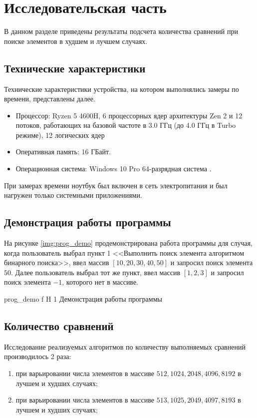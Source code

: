 \chapter{Исследовательская часть}

В данном разделе приведены результаты подсчета количества сравнений при поиске элементов в худшем и лучшем случаях.

\section{Технические характеристики}

Технические характеристики устройства, на котором выполнялись замеры по времени, представлены далее.

\begin{itemize}
	\item Процессор: Ryzen 5 4600H, 6 процессорных ядер архитектуры Zen 2 и 12 потоков, работающих на базовой частоте в 3.0 ГГц (до 4.0 ГГц в Turbo режиме), 12 логических ядер~\cite{ryzen}
	\item Оперативная память: 16 ГБайт.
	\item Операционная система: Windows 10 Pro 64-разрядная система \cite{windows}.
\end{itemize}

При замерах времени ноутбук был включен в сеть электропитания и был нагружен только системными приложениями.

\section{Демонстрация работы программы}

На рисунке \ref{img:prog_demo} продемонстрирована работа программы для случая, когда пользователь выбрал пункт 1 <<Выполнить поиск элемента алгоритмом бинарного поиска>>, ввел массив $[10, 20, 30, 40, 50]$ и запросил поиск элемента $50$.
Далее пользователь выбрал тот же пункт, ввел массив $[1, 2, 3]$ и запросил поиск элемента $-1$, которого нет в массиве.

	{prog_demo}
	{f}
	{H}
	{1\textwidth}
	{Демонстрация работы программы}

\section{Количество сравнений}

Исследование реализуемых алгоритмов по количеству выполняемых сравнений производилось 2 раза:
\begin{enumerate}
	\item при варьировании числа элементов в массиве $512, 1024, 2048, 4096, 8192$ в лучшем и худших случаях;
	\item при варьировании числа элементов в массиве $513, 1025, 2049, 4097, 8193$ в лучшем и худших случаях;
\end{enumerate}

